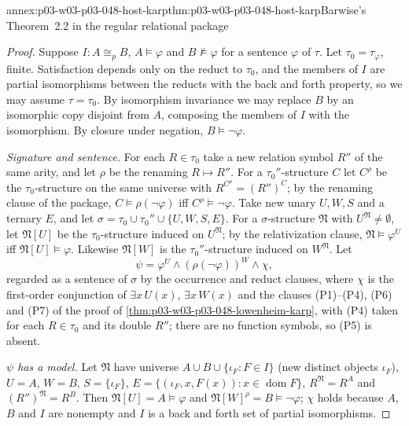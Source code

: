 \begin{annexitem}{annex:p03-w03-p03-048-host-karp}{thm:p03-w03-p03-048-host-karp}{Barwise's Theorem~2.2 in the regular relational package}
\begin{proof}
Suppose \(I:A\cong_pB\), \(A\models\varphi\) and \(B\not\models\varphi\) for a
sentence \(\varphi\) of \(\tau\).  Let \(\tau_0=\tau_\varphi\), finite.
Satisfaction depends only on the reduct to \(\tau_0\), and the members of
\(I\) are partial isomorphisms between the reducts with the back and forth
property, so we may assume \(\tau=\tau_0\).  By isomorphism invariance we may
replace \(B\) by an isomorphic copy disjoint from \(A\), composing the members
of \(I\) with the isomorphism.  By closure under negation,
\(B\models\neg\varphi\).

\emph{Signature and sentence.}  For each \(R\in\tau_0\) take a new relation
symbol \(R''\) of the same arity, and let \(\rho\) be the renaming
\(R\mapsto R''\).  For a \(\tau_0''\)-structure \(C\) let \(C^{\rho}\) be the
\(\tau_0\)-structure on the same universe with \(R^{C^{\rho}}=(R'')^{C}\); by
the renaming clause of the package, \(C\models\rho(\neg\varphi)\) iff
\(C^{\rho}\models\neg\varphi\).  Take new unary \(U,W,S\) and a ternary \(E\),
and let \(\sigma=\tau_0\cup\tau_0''\cup\{U,W,S,E\}\).  For a
\(\sigma\)-structure \(\mathfrak N\) with \(U^{\mathfrak N}\neq\emptyset\), let
\(\mathfrak N[U]\) be the \(\tau_0\)-structure induced on \(U^{\mathfrak N}\);
by the relativization clause, \(\mathfrak N\models\varphi^{U}\) iff
\(\mathfrak N[U]\models\varphi\).  Likewise \(\mathfrak N[W]\) is the
\(\tau_0''\)-structure induced on \(W^{\mathfrak N}\).  Let
\[
\psi=\varphi^{U}\land(\rho(\neg\varphi))^{W}\land\chi,
\]
regarded as a sentence of \(\sigma\) by the occurrence and reduct clauses,
where \(\chi\) is the first-order conjunction of \(\exists x\,U(x)\),
\(\exists x\,W(x)\) and the clauses (P1)--(P4), (P6) and (P7) of the proof
of \cref{thm:p03-w03-p03-048-lowenheim-karp}, with (P4) taken for each
\(R\in\tau_0\) and its double \(R''\); there are no function symbols, so (P5)
is absent.

\emph{\(\psi\) has a model.}  Let \(\mathfrak N\) have universe
\(A\cup B\cup\{\iota_F:F\in I\}\) (new distinct objects \(\iota_F\)),
\(U=A\), \(W=B\), \(S=\{\iota_F\}\), \(E=\{(\iota_F,x,F(x)):x\in
\operatorname{dom}F\}\), \(R^{\mathfrak N}=R^{A}\) and
\((R'')^{\mathfrak N}=R^{B}\).  Then \(\mathfrak N[U]=A\models\varphi\) and
\(\mathfrak N[W]^{\rho}=B\models\neg\varphi\); \(\chi\) holds because \(A\),
\(B\) and \(I\) are nonempty and \(I\) is a back and forth set of partial
isomorphisms.


\end{proof}
\end{annexitem}

